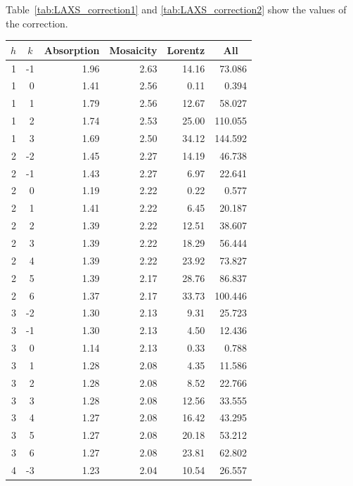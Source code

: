Table~\ref{tab:LAXS_correction1} and \ref{tab:LAXS_correction2} show
the values of the correction.

\begin{table}[htbp]
  \centering
    \begin{tabular}{rrrrrr}
    \hline
    \multicolumn{1}{c}{$h$} & \multicolumn{1}{c}{$k$} & \multicolumn{1}{c}{Absorption} & \multicolumn{1}{c}{Mosaicity} & \multicolumn{1}{c}{Lorentz} & \multicolumn{1}{c}{All} \\
    \hline    
    1  & -1 & 1.96 & 2.63 & 14.16 & 73.086  \\
    1  & 0  & 1.41 & 2.56 & 0.11  & 0.394   \\
    1  & 1  & 1.79 & 2.56 & 12.67 & 58.027  \\
    1  & 2  & 1.74 & 2.53 & 25.00 & 110.055 \\
    1  & 3  & 1.69 & 2.50 & 34.12 & 144.592 \\
    2  & -2 & 1.45 & 2.27 & 14.19 & 46.738  \\
    2  & -1 & 1.43 & 2.27 & 6.97  & 22.641  \\
    2  & 0  & 1.19 & 2.22 & 0.22  & 0.577   \\
    2  & 1  & 1.41 & 2.22 & 6.45  & 20.187  \\
    2  & 2  & 1.39 & 2.22 & 12.51 & 38.607  \\
    2  & 3  & 1.39 & 2.22 & 18.29 & 56.444  \\
    2  & 4  & 1.39 & 2.22 & 23.92 & 73.827  \\
    2  & 5  & 1.39 & 2.17 & 28.76 & 86.837  \\
    2  & 6  & 1.37 & 2.17 & 33.73 & 100.446 \\
    3  & -2 & 1.30 & 2.13 & 9.31  & 25.723  \\
    3  & -1 & 1.30 & 2.13 & 4.50  & 12.436  \\
    3  & 0  & 1.14 & 2.13 & 0.33  & 0.788   \\
    3  & 1  & 1.28 & 2.08 & 4.35  & 11.586  \\
    3  & 2  & 1.28 & 2.08 & 8.52  & 22.766  \\
    3  & 3  & 1.28 & 2.08 & 12.56 & 33.555  \\
    3  & 4  & 1.27 & 2.08 & 16.42 & 43.295  \\
    3  & 5  & 1.27 & 2.08 & 20.18 & 53.212  \\
    3  & 6  & 1.27 & 2.08 & 23.81 & 62.802  \\
    4  & -3 & 1.23 & 2.04 & 10.54 & 26.557  \\

\end{tabular}
\end{table}
